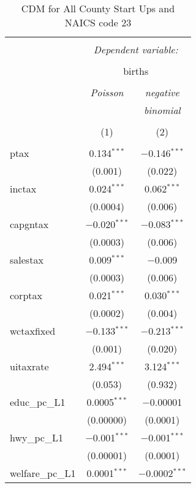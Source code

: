 
\begin{table}[!htbp] \centering 
  \caption{CDM for All County Start Ups and NAICS code 23} 
  \label{} 
\begin{tabular}{@{\extracolsep{5pt}}lcc} 
\\[-1.8ex]\hline 
\hline \\[-1.8ex] 
 & \multicolumn{2}{c}{\textit{Dependent variable:}} \\ 
\cline{2-3} 
\\[-1.8ex] & \multicolumn{2}{c}{births} \\ 
\\[-1.8ex] & \textit{Poisson} & \textit{negative} \\ 
 & \textit{} & \textit{binomial} \\ 
\\[-1.8ex] & (1) & (2)\\ 
\hline \\[-1.8ex] 
 ptax & 0.134$^{***}$ & $-$0.146$^{***}$ \\ 
  & (0.001) & (0.022) \\ 
  inctax & 0.024$^{***}$ & 0.062$^{***}$ \\ 
  & (0.0004) & (0.006) \\ 
  capgntax & $-$0.020$^{***}$ & $-$0.083$^{***}$ \\ 
  & (0.0003) & (0.006) \\ 
  salestax & 0.009$^{***}$ & $-$0.009 \\ 
  & (0.0003) & (0.006) \\ 
  corptax & 0.021$^{***}$ & 0.030$^{***}$ \\ 
  & (0.0002) & (0.004) \\ 
  wctaxfixed & $-$0.133$^{***}$ & $-$0.213$^{***}$ \\ 
  & (0.001) & (0.020) \\ 
  uitaxrate & 2.494$^{***}$ & 3.124$^{***}$ \\ 
  & (0.053) & (0.932) \\ 
  educ\_pc\_L1 & 0.0005$^{***}$ & $-$0.00001 \\ 
  & (0.00000) & (0.0001) \\ 
  hwy\_pc\_L1 & $-$0.001$^{***}$ & $-$0.001$^{***}$ \\ 
  & (0.00001) & (0.0001) \\ 
  welfare\_pc\_L1 & 0.0001$^{***}$ & $-$0.0002$^{***}$ \\ 

\end{tabular}
\end{table}
